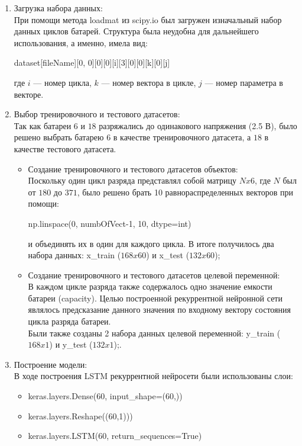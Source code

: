\documentclass[russian,english,18pt,a4paper,reqno,dviphfm]{article}
\begin{document}
\begin{enumerate}
	\item Загрузка набора данных: \\
	При помощи метода loadmat из scipy.io был загружен изначальный набор данных циклов батарей. Структура была неудобна для дальнейшего использования, а именно, имела вид: 
	\begin{python}
dataset[fileName][0, 0][0][0][i][3][0][0][k][0][j]
	\end{python}
	где $i$ --- номер цикла, $k$ --- номер вектора в цикле, $j$ --- номер параметра в векторе.
	\item Выбор тренировочного и тестового датасетов:
	 \\ Так как батареи $6$ и $18$ разряжались до одинакового напряжения (2.5 В), было решено выбрать батарею $6$ в качестве тренировочного датасета, а $18$ в качестве тестового датасета.
	\begin{itemize}
		\item Создание тренировочного и тестового датасетов объектов: \\ 
		Поскольку один цикл разряда представлял собой матрицу $Nx6$, где $N$ был от $180$ до $371$, было решено брать 10 равнораспределенных векторов при помощи: \begin{python}
np.linspace(0, numbOfVect-1, 10, dtype=int)
		\end{python} и объединять их в один для каждого цикла. 
		В итоге получилось два набора данных: x\_train ($168x60$) и x\_test ($132x60$);
		\item Создание тренировочного и тестового датасетов целевой переменной: \\ 
		В каждом цикле разряда также содержалось одно значение емкости батареи (capacity). Целью построенной рекуррентной нейронной сети являлось предсказание данного значения по входному вектору состояния цикла разряда батареи. \\
		 Были также созданы 2 набора данных целевой переменной: y\_train ($168x1$) и y\_test ($132x1$);.
	\end{itemize}
	\item Построение модели:\\
	В ходе построения LSTM рекуррентной нейросети были использованы слои: 
	\begin{itemize}
	    \item[] keras.layers.Dense(60, input\_shape=(60,))
	    \item[] keras.layers.Reshape((60,1)))
	    \item[] keras.layers.LSTM(60, return\_sequences=True)

\end{itemize}
\end{enumerate}
\end{document}
